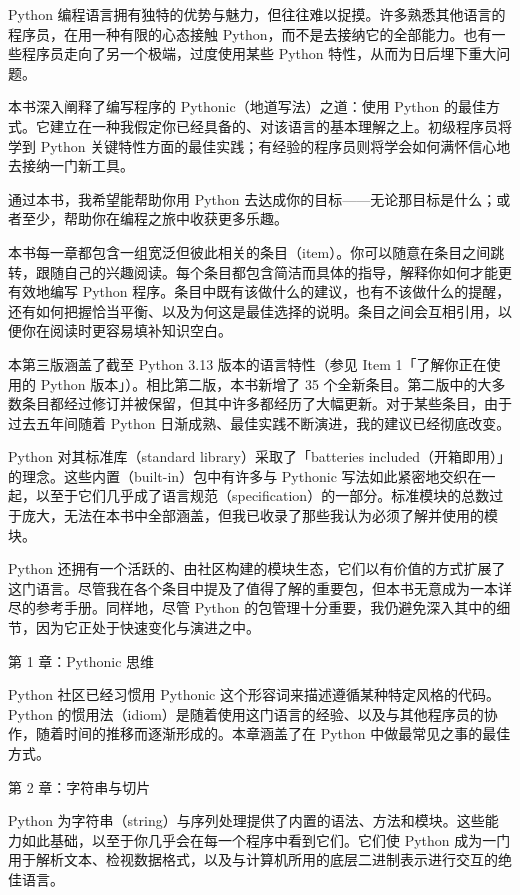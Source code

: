 Python 编程语言拥有独特的优势与魅力，但往往难以捉摸。许多熟悉其他语言的程序员，在用一种有限的心态接触 Python，而不是去接纳它的全部能力。也有一些程序员走向了另一个极端，过度使用某些 Python 特性，从而为日后埋下重大问题。

本书深入阐释了编写程序的 Pythonic（地道写法）之道：使用 Python 的最佳方式。它建立在一种我假定你已经具备的、对该语言的基本理解之上。初级程序员将学到 Python 关键特性方面的最佳实践；有经验的程序员则将学会如何满怀信心地去接纳一门新工具。

通过本书，我希望能帮助你用 Python 去达成你的目标——无论那目标是什么；或者至少，帮助你在编程之旅中收获更多乐趣。

本书每一章都包含一组宽泛但彼此相关的条目（item）。你可以随意在条目之间跳转，跟随自己的兴趣阅读。每个条目都包含简洁而具体的指导，解释你如何才能更有效地编写 Python 程序。条目中既有该做什么的建议，也有不该做什么的提醒，还有如何把握恰当平衡、以及为何这是最佳选择的说明。条目之间会互相引用，以便你在阅读时更容易填补知识空白。

本第三版涵盖了截至 Python 3.13 版本的语言特性（参见 Item 1「了解你正在使用的 Python 版本」）。相比第二版，本书新增了 35 个全新条目。第二版中的大多数条目都经过修订并被保留，但其中许多都经历了大幅更新。对于某些条目，由于过去五年间随着 Python 日渐成熟、最佳实践不断演进，我的建议已经彻底改变。

Python 对其标准库（standard library）采取了「batteries included（开箱即用）」的理念。这些内置（built-in）包中有许多与 Pythonic 写法如此紧密地交织在一起，以至于它们几乎成了语言规范（specification）的一部分。标准模块的总数过于庞大，无法在本书中全部涵盖，但我已收录了那些我认为必须了解并使用的模块。

Python 还拥有一个活跃的、由社区构建的模块生态，它们以有价值的方式扩展了这门语言。尽管我在各个条目中提及了值得了解的重要包，但本书无意成为一本详尽的参考手册。同样地，尽管 Python 的包管理十分重要，我仍避免深入其中的细节，因为它正处于快速变化与演进之中。

第 1 章：Pythonic 思维

Python 社区已经习惯用 Pythonic 这个形容词来描述遵循某种特定风格的代码。Python 的惯用法（idiom）是随着使用这门语言的经验、以及与其他程序员的协作，随着时间的推移而逐渐形成的。本章涵盖了在 Python 中做最常见之事的最佳方式。

第 2 章：字符串与切片

Python 为字符串（string）与序列处理提供了内置的语法、方法和模块。这些能力如此基础，以至于你几乎会在每一个程序中看到它们。它们使 Python 成为一门用于解析文本、检视数据格式，以及与计算机所用的底层二进制表示进行交互的绝佳语言。


